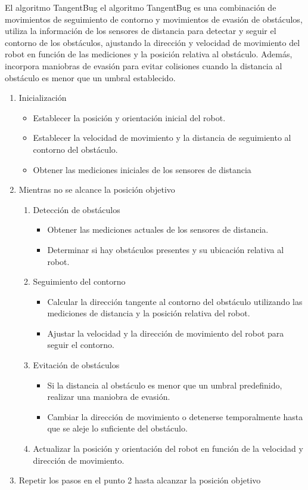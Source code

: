 \documentclass{article}
\begin{document}
\begin{itemize}
  El algoritmo TangentBug el algoritmo TangentBug es una combinación de movimientos de seguimiento de contorno y movimientos de evasión de obstáculos, utiliza la información de los sensores de distancia para detectar y seguir el contorno de los obstáculos, ajustando la dirección y velocidad de movimiento del robot en función de las mediciones y la posición relativa al obstáculo. Además, incorpora maniobras de evasión para evitar colisiones cuando la distancia al obstáculo es menor que un umbral establecido.

  \begin{enumerate}
  \item Inicialización
    \begin{itemize}
    \item Establecer la posición y orientación inicial del robot.
    \item Establecer la velocidad de movimiento y la distancia de seguimiento al contorno del obstáculo.
    \item Obtener las mediciones iniciales de los sensores de distancia
    \end{itemize}
  \item Mientras no se alcance la posición objetivo
    \begin{enumerate}
    \item Detección de obstáculos
      \begin{itemize}
      \item Obtener las mediciones actuales de los sensores de distancia.
      \item Determinar si hay obstáculos presentes y su ubicación relativa al robot.
      \end{itemize}
    \item Seguimiento del contorno
      \begin{itemize}
      \item Calcular la dirección tangente al contorno del obstáculo utilizando las mediciones de distancia y la posición relativa del robot.
      \item Ajustar la velocidad y la dirección de movimiento del robot para seguir el contorno.
      \end{itemize}
    \item Evitación de obstáculos
      \begin{itemize}
      \item Si la distancia al obstáculo es menor que un umbral predefinido, realizar una maniobra de evasión.
      \item Cambiar la dirección de movimiento o detenerse temporalmente hasta que se aleje lo suficiente del obstáculo.
      \end{itemize}
    \item Actualizar la posición y orientación del robot en función de la velocidad y dirección de movimiento.
    \end{enumerate}
  \item Repetir los pasos en el punto 2 hasta alcanzar la posición objetivo
  \end{enumerate}
  
\end{itemize}

\end{document}
